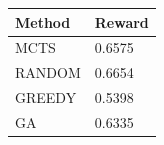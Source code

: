 \begin{tabular}{ll}
\hline
Method & Reward \\
\hline
  MCTS & 0.6575 \\
  RANDOM & 0.6654 \\
  GREEDY & 0.5398 \\
  GA & 0.6335 \\
\hline
\end{tabular}
